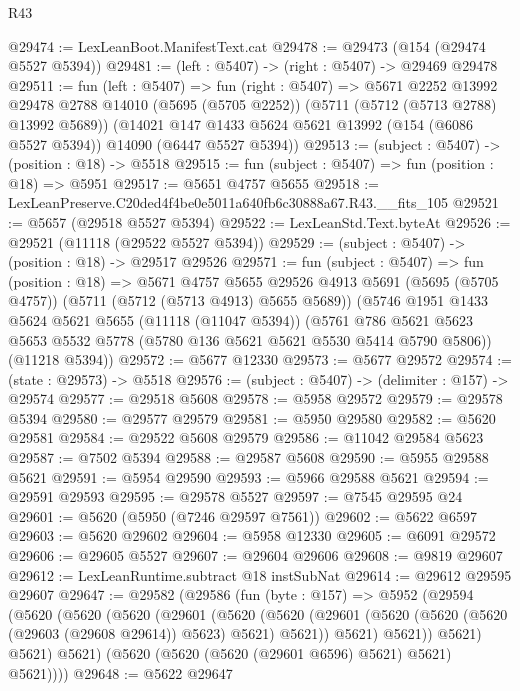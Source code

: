 \begin{lexlean}{R43}
\begin{coremodule}
@29474 := LexLeanBoot.ManifestText.cat
@29478 := @29473 (@154 (@29474 @5527 @5394))
@29481 := (left : @5407) -> (right : @5407) -> @29469 @29478
@29511 := fun (left : @5407) =>
  fun (right : @5407) =>
  @5671
    @2252
    @13992
    @29478
    @2788
    @14010
    (@5695 (@5705 @2252))
    (@5711 (@5712 (@5713 @2788) @13992 @5689))
    (@14021 @147 @1433 @5624 @5621 @13992 (@154 (@6086 @5527 @5394)) @14090 (@6447 @5527 @5394))
@29513 := (subject : @5407) -> (position : @18) -> @5518
@29515 := fun (subject : @5407) => fun (position : @18) => @5951
@29517 := @5651 @4757 @5655
@29518 := LexLeanPreserve.C20ded4f4be0e5011a640fb6c30888a67.R43.__fits_105
@29521 := @5657 (@29518 @5527 @5394)
@29522 := LexLeanStd.Text.byteAt
@29526 := @29521 (@11118 (@29522 @5527 @5394))
@29529 := (subject : @5407) -> (position : @18) -> @29517 @29526
@29571 := fun (subject : @5407) =>
  fun (position : @18) =>
  @5671
    @4757
    @5655
    @29526
    @4913
    @5691
    (@5695 (@5705 @4757))
    (@5711 (@5712 (@5713 @4913) @5655 @5689))
    (@5746
      @1951
      @1433
      @5624
      @5621
      @5655
      (@11118 (@11047 @5394))
      (@5761 @786 @5621 @5623 @5653 @5532 @5778 (@5780 @136 @5621 @5621 @5530 @5414 @5790 @5806))
      (@11218 @5394))
@29572 := @5677 @12330
@29573 := @5677 @29572
@29574 := (state : @29573) -> @5518
@29576 := (subject : @5407) -> (delimiter : @157) -> @29574
@29577 := @29518 @5608
@29578 := @5958 @29572
@29579 := @29578 @5394
@29580 := @29577 @29579
@29581 := @5950 @29580
@29582 := @5620 @29581
@29584 := @29522 @5608 @29579
@29586 := @11042 @29584 @5623
@29587 := @7502 @5394
@29588 := @29587 @5608
@29590 := @5955 @29588 @5621
@29591 := @5954 @29590
@29593 := @5966 @29588 @5621
@29594 := @29591 @29593
@29595 := @29578 @5527
@29597 := @7545 @29595 @24
@29601 := @5620 (@5950 (@7246 @29597 @7561))
@29602 := @5622 @6597
@29603 := @5620 @29602
@29604 := @5958 @12330
@29605 := @6091 @29572
@29606 := @29605 @5527
@29607 := @29604 @29606
@29608 := @9819 @29607
@29612 := LexLeanRuntime.subtract @18 instSubNat
@29614 := @29612 @29595 @29607
@29647 := @29582
    (@29586
      (fun (byte : @157) =>
      @5952
        (@29594
          (@5620
            (@5620
              (@5620
                (@29601
                  (@5620
                    (@5620
                      (@29601 (@5620 (@5620 (@5620 (@29603 (@29608 @29614)) @5623) @5621) @5621))
                      @5621)
                    @5621))
                @5621)
              @5621)
            @5621)
          (@5620 (@5620 (@5620 (@29601 @6596) @5621) @5621) @5621))))
@29648 := @5622 @29647

\end{coremodule}
\end{lexlean}
